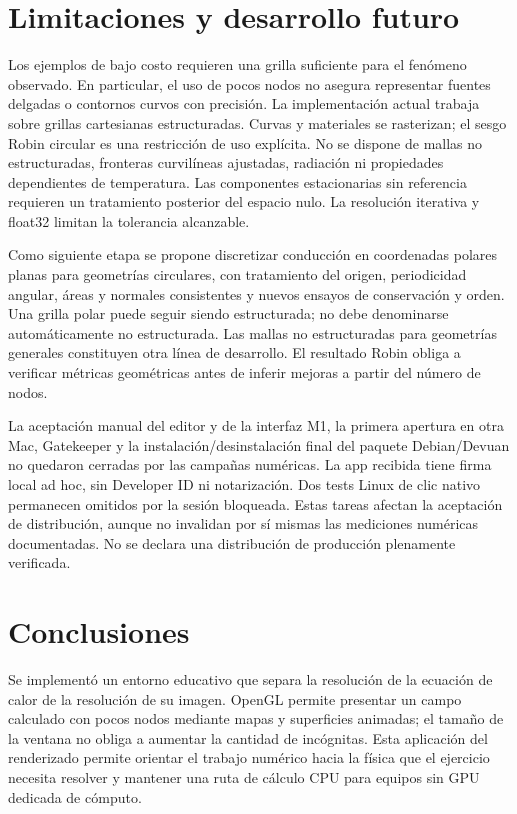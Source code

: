 \documentclass[11pt,a4paper]{article}
\begin{document}
\section{Limitaciones y desarrollo futuro}
Los ejemplos de bajo costo requieren una grilla suficiente para el fenómeno observado. En particular, el uso de pocos nodos no asegura representar fuentes delgadas o contornos curvos con precisión. La implementación actual trabaja sobre grillas cartesianas estructuradas. Curvas y materiales se rasterizan; el sesgo Robin circular es una restricción de uso explícita. No se dispone de mallas no estructuradas, fronteras curvilíneas ajustadas, radiación ni propiedades dependientes de temperatura. Las componentes estacionarias sin referencia requieren un tratamiento posterior del espacio nulo. La resolución iterativa y float32 limitan la tolerancia alcanzable.

Como siguiente etapa se propone discretizar conducción en coordenadas polares planas para geometrías circulares, con tratamiento del origen, periodicidad angular, áreas y normales consistentes y nuevos ensayos de conservación y orden. Una grilla polar puede seguir siendo estructurada; no debe denominarse automáticamente no estructurada. Las mallas no estructuradas para geometrías generales constituyen otra línea de desarrollo. El resultado Robin obliga a verificar métricas geométricas antes de inferir mejoras a partir del número de nodos.

La aceptación manual del editor y de la interfaz M1, la primera apertura en otra Mac, Gatekeeper y la instalación/desinstalación final del paquete Debian/Devuan no quedaron cerradas por las campañas numéricas. La app recibida tiene firma local ad hoc, sin Developer ID ni notarización. Dos tests Linux de clic nativo permanecen omitidos por la sesión bloqueada. Estas tareas afectan la aceptación de distribución, aunque no invalidan por sí mismas las mediciones numéricas documentadas. No se declara una distribución de producción plenamente verificada.

\section{Conclusiones}
Se implementó un entorno educativo que separa la resolución de la ecuación de calor de la resolución de su imagen. OpenGL permite presentar un campo calculado con pocos nodos mediante mapas y superficies animadas; el tamaño de la ventana no obliga a aumentar la cantidad de incógnitas. Esta aplicación del renderizado permite orientar el trabajo numérico hacia la física que el ejercicio necesita resolver y mantener una ruta de cálculo CPU para equipos sin GPU dedicada de cómputo.
\end{document}
